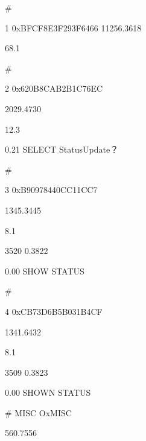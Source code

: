 #

1 0xBFCF8E3F293F6466 11256.3618

68.1%

#

2 0x620B8CAB2B1C76EC

2029.4730

12.3%

0.21 SELECT StatusUpdate？

#

3 0xB90978440CC11CC7

1345.3445

8.1%

3520 0.3822

0.00 SHOW STATUS

#

4 0xCB73D6B5B031B4CF

1341.6432

8.1%

3509 0.3823

0.00 SHOWN STATUS

# MISC OxMISC

560.7556

